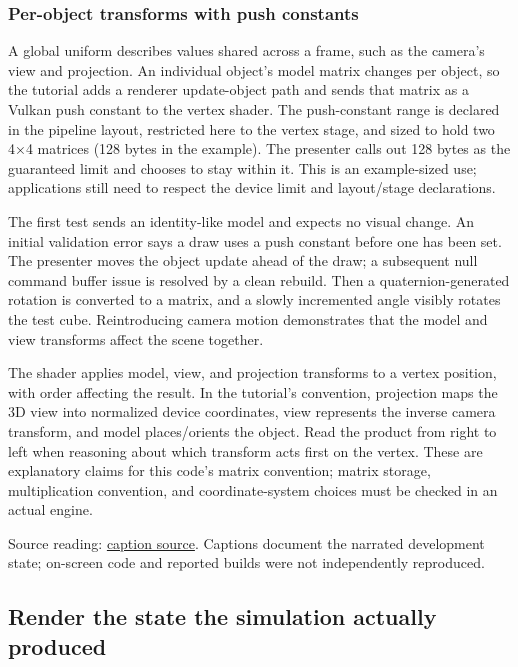 \subsubsection{Per-object transforms with push constants}\label{06-engine-ii-ch026-per-object-transforms-with-push-constants}

A global uniform describes values shared across a frame, such as the camera's view and projection. An individual object's model matrix changes per object, so the tutorial adds a renderer update-object path and sends that matrix as a Vulkan push constant to the vertex shader. The push-constant range is declared in the pipeline layout, restricted here to the vertex stage, and sized to hold two 4×4 matrices (128 bytes in the example). The presenter calls out 128 bytes as the guaranteed limit and chooses to stay within it. This is an example-sized use; applications still need to respect the device limit and layout/stage declarations.

The first test sends an identity-like model and expects no visual change. An initial validation error says a draw uses a push constant before one has been set. The presenter moves the object update ahead of the draw; a subsequent null command buffer issue is resolved by a clean rebuild. Then a quaternion-generated rotation is converted to a matrix, and a slowly incremented angle visibly rotates the test cube. Reintroducing camera motion demonstrates that the model and view transforms affect the scene together.

The shader applies model, view, and projection transforms to a vertex position, with order affecting the result. In the tutorial's convention, projection maps the 3D view into normalized device coordinates, view represents the inverse camera transform, and model places/orients the object. Read the product from right to left when reasoning about which transform acts first on the vertex. These are explanatory claims for this code's matrix convention; matrix storage, multiplication convention, and coordinate-system choices must be checked in an actual engine.

Source reading: \href{https://www.youtube.com/watch?v=xGonaV-OB7E}{caption source}. Captions document the narrated development state; on-screen code and reported builds were not independently reproduced.

\subsection{Render the state the simulation actually produced}\label{06-engine-ii-ch026-render-the-state-the-simulation-actually-produced}

